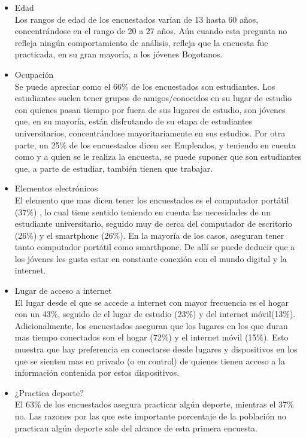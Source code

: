 \begin{itemize}
  \item Edad \\
  Los rangos de edad de los encuestados varían de 13 hasta 60 años, concentrándose en el rango de 20 a 27 años. Aún cuando esta pregunta no refleja ningún comportamiento de análisis, refleja que la encuesta fue practicada, en su gran mayoría, a los jóvenes Bogotanos.
  \item Ocupación \\
  Se puede apreciar como el 66\% de los encuestados son estudiantes. Los estudiantes suelen tener grupos de amigos/conocidos en su lugar de estudio con quienes pasan tiempo por fuera de sus lugares de estudio, son jóvenes que, en su mayoría, están disfrutando de su etapa de estudiantes universitarios, concentrándose mayoritariamente en sus estudios. Por otra parte, un 25\% de los encuestados dicen ser Empleados, y teniendo en cuenta como y a quien se le realiza la encuesta, se puede suponer que son estudiantes que, a parte de estudiar, también tienen que trabajar.
  \item Elementos electrónicos \\
  El elemento que mas  dicen tener los encuestados es el computador portátil (37\%) , lo cual tiene sentido teniendo en cuenta las necesidades de un estudiante universitario, seguido muy de cerca del computador de escritorio (26\%) y el smartphone (26\%). En la mayoría de los casos, aseguran tener tanto computador portátil como smarthpone. De allí se puede deducir que a los jóvenes les gusta estar en constante conexión con el mundo digital y la internet.
  \item Lugar de acceso a internet \\
  El lugar desde el que se accede a internet con mayor frecuencia es el hogar con un 43\%, seguido de el lugar de estudio (23\%) y del internet móvil(13\%). Adicionalmente, los encuestados aseguran que los lugares en los que duran mas tiempo conectados son el hogar (72\%) y el internet móvil (15\%). Esto muestra que hay preferencia en conectarse desde lugares y dispositivos en los que se sienten mas en privado (o en control) de quienes tienen acceso a la información contenida por estos dispositivos.
  \item ¿Practica deporte? \\
  El 63\% de los encuestados asegura practicar algún deporte, mientras el 37\% no. Las razones por las que este importante porcentaje de la población no practican algún deporte sale del alcance de esta primera encuesta.

\end{itemize}
